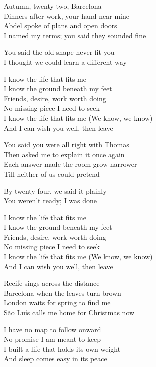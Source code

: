\begin{lyrics}
Autumn, twenty-two, Barcelona\\
Dinners after work, your hand near mine\\
Abdel spoke of plans and open doors\\
I named my terms; you said they sounded fine

You said the old shape never fit you\\
I thought we could learn a different way

I know the life that fits me\\
I know the ground beneath my feet\\
Friends, desire, work worth doing\\
No missing piece I need to seek\\
I know the life that fits me
(We know, we know)\\
And I can wish you well, then leave

You said you were all right with Thomas\\
Then asked me to explain it once again\\
Each answer made the room grow narrower\\
Till neither of us could pretend

By twenty-four, we said it plainly\\
You weren’t ready; I was done

I know the life that fits me\\
I know the ground beneath my feet\\
Friends, desire, work worth doing\\
No missing piece I need to seek\\
I know the life that fits me
(We know, we know)\\
And I can wish you well, then leave


Recife sings across the distance\\
Barcelona when the leaves turn brown\\
London waits for spring to find me\\
São Luís calls me home for Christmas now

I have no map to follow onward\\
No promise I am meant to keep\\
I built a life that holds its own weight\\
And sleep comes easy in its peace


\end{lyrics}
